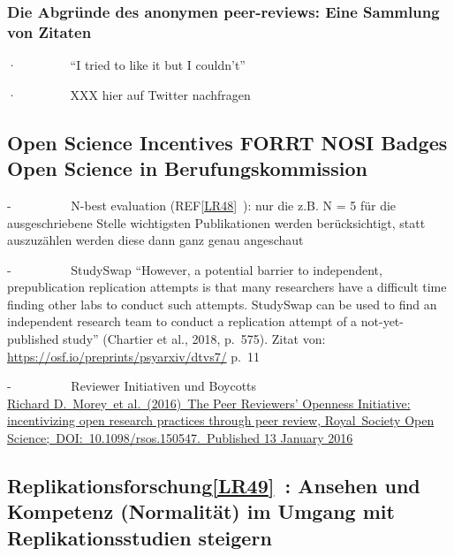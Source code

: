 \documentclass[
  letterpaper,
  DIV=11,
  numbers=noendperiod]{scrreprt}
\begin{document}
\subsubsection{Die Abgründe des anonymen peer-reviews: Eine Sammlung von
Zitaten}\label{die-abgruxfcnde-des-anonymen-peer-reviews-eine-sammlung-von-zitaten}

·~~~~~~~~ ``I tried to like it but I couldn't''

·~~~~~~~~ XXX hier auf Twitter nachfragen

\subsection{Open Science Incentives FORRT NOSI Badges Open Science in
Berufungskommission}\label{open-science-incentives-forrt-nosi-badges-open-science-in-berufungskommission}

-~~~~~~~~~ N-best evaluation (REF\hyperref[_msocom_48]{{[}LR48{]}}~):
nur die z.B. N = 5 für die ausgeschriebene Stelle wichtigsten
Publikationen werden berücksichtigt, statt auszuzählen werden diese dann
ganz genau angeschaut

-~~~~~~~~~ StudySwap ``However, a potential barrier to independent,
prepublication replication attempts is that many researchers have a
difficult time finding other labs to conduct such attempts. StudySwap
can be used to find an independent research team to conduct a
replication attempt of a not-yet-published study'' (Chartier et al.,
2018, p.~575). Zitat von: \url{https://osf.io/preprints/psyarxiv/dtvs7/}
p.~11

-~~~~~~~~~ Reviewer Initiativen und Boycotts\\
\href{http://rsos.royalsocietypublishing.org/content/3/1/150547\#sec-6}{Richard
D.~Morey~et al.~(2016)~The Peer Reviewers' Openness Initiative:
incentivizing open research practices through peer review, Royal~Society
Open Science;~DOI:~10.1098/rsos.150547.~Published 13 January 2016}

\subsection{\texorpdfstring{Replikationsforschung\hyperref[_msocom_49]{{[}LR49{]}}~:
Ansehen und Kompetenz (Normalität) im Umgang mit Replikationsstudien
steigern}{Replikationsforschung{[}LR49{]}~: Ansehen und Kompetenz (Normalität) im Umgang mit Replikationsstudien steigern}}\label{replikationsforschunglr49-ansehen-und-kompetenz-normalituxe4t-im-umgang-mit-replikationsstudien-steigern}
\end{document}
